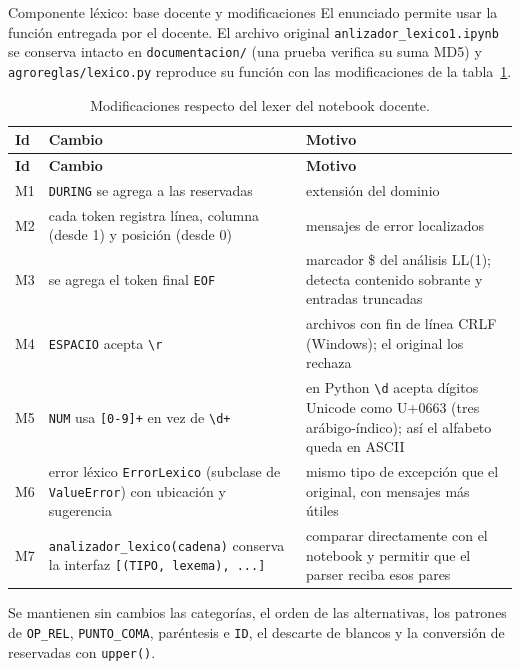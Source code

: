 \documentclass[11pt,letterpaper]{article}
\makeatletter
\renewcommand\subsection{\@startsection{subsection}{2}{\z@}{-2.6ex\@plus -1ex \@minus -.2ex}{1.0ex \@plus .2ex}%
  {\normalfont\large\bfseries}}
\newcommand{\ruta}[1]{\nolinkurl{#1}}
\newcommand{\T}[1]{\texttt{#1}}
\newcommand{\cabeza}{\rowcolor{cabecera}}
\makeatother
\begin{document}
\subsection{Componente léxico: base docente y modificaciones}\label{sec:lexico}
El enunciado permite usar la función entregada por el docente. El archivo original
\ruta{anlizador_lexico1.ipynb} se conserva intacto en \ruta{documentacion/} (una prueba verifica su
suma MD5) y \ruta{agroreglas/lexico.py} reproduce su función con las modificaciones de la
tabla~\ref{tab:modificaciones}.

\begin{longtable}{p{0.8cm}>{\raggedright}p{6.4cm}p{8.4cm}}
\caption{Modificaciones respecto del lexer del notebook docente.}\label{tab:modificaciones}\\
\hline\cabeza \textbf{Id} & \textbf{Cambio} & \textbf{Motivo}\\\hline\endfirsthead
\hline\cabeza \textbf{Id} & \textbf{Cambio} & \textbf{Motivo}\\\hline\endhead
M1 & \T{DURING} se agrega a las reservadas & extensión del dominio\\
M2 & cada token registra línea, columna (desde 1) y posición (desde 0) & mensajes de error localizados\\
M3 & se agrega el token final \T{EOF} & marcador \$ del análisis LL(1); detecta contenido sobrante y entradas truncadas\\
M4 & \T{ESPACIO} acepta \T{\textbackslash r} & archivos con fin de línea CRLF (Windows); el original los rechaza\\
M5 & \T{NUM} usa \T{[0-9]+} en vez de \T{\textbackslash d+} & en Python \T{\textbackslash d} acepta dígitos Unicode como U+0663 (tres arábigo-índico); así el
alfabeto queda en ASCII\\
M6 & error léxico \T{ErrorLexico} (subclase de \T{ValueError}) con ubicación y sugerencia & mismo tipo de excepción
que el original, con mensajes más útiles\\
M7 & \T{analizador\_lexico(cadena)} conserva la interfaz \T{[(TIPO, lexema), ...]} & comparar directamente con el
notebook y permitir que el parser reciba esos pares\\\hline
\end{longtable}

Se mantienen sin cambios las categorías, el orden de las alternativas, los patrones de \T{OP\_REL},
\T{PUNTO\_COMA}, paréntesis e \T{ID}, el descarte de blancos y la conversión de reservadas con \T{upper()}.
\end{document}
